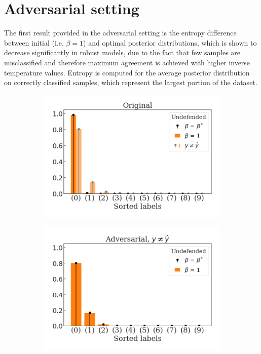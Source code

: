 \section{Adversarial setting}\label{sec:appendix_results_adversarial}

The first result provided in the adversarial setting is the entropy difference
between initial (i.e. $\beta=1$) and optimal posterior distributions, which is shown
to decrease significantly in robust models, due to the fact that few samples
are misclassified and therefore maximum agreement is achieved with higher
inverse temperature values. Entropy is computed for the average posterior distribution
on correctly classified samples, which represent the largest portion of the dataset.

\begin{figure}[H]
    \centering
    \begin{subfigure}[b]{0.45\textwidth}
        \centering
        \includegraphics[width=\textwidth]{img/results_discussion/adversarial/Standard_orig_PGD_0.0314.png}
    \end{subfigure}
    \hfill
    \begin{subfigure}[b]{0.45\textwidth}
        \centering
        \includegraphics[width=\textwidth]{img/results_discussion/adversarial/Standard_adv_PGD_0.0314.png}
    \end{subfigure}


\end{figure}
